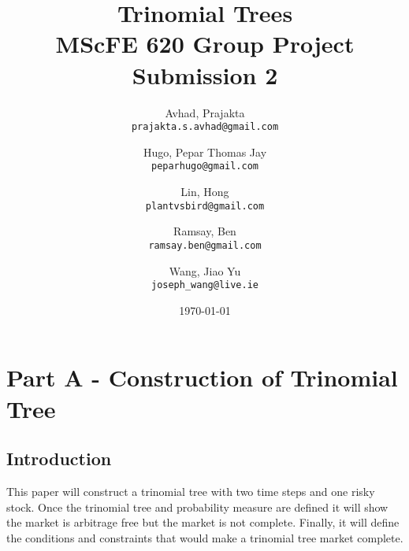 \documentclass{article}
\title{Trinomial Trees \\ MScFE 620 Group Project Submission 2}
\date{\today}
\author{
  Avhad, Prajakta\\
  \texttt{prajakta.s.avhad@gmail.com}
  \and
  Hugo, Pepar Thomas Jay\\
  \texttt{peparhugo@gmail.com}
  \and
  Lin, Hong\\
  \texttt{plantvsbird@gmail.com}
  \and
  Ramsay, Ben\\
  \texttt{ramsay.ben@gmail.com}
  \and
  Wang, Jiao Yu\\
  \texttt{joseph\_wang@live.ie}
}
\begin{document}
\maketitle  


\section{Part A - Construction of Trinomial Tree}
\subsection{Introduction}

This paper will construct a trinomial tree with two time steps and one risky stock. Once the trinomial tree and probability measure are defined it will show the market is arbitrage free but the market is not complete. Finally, it will define the conditions and constraints that would make a trinomial tree market complete.
\end{document}
